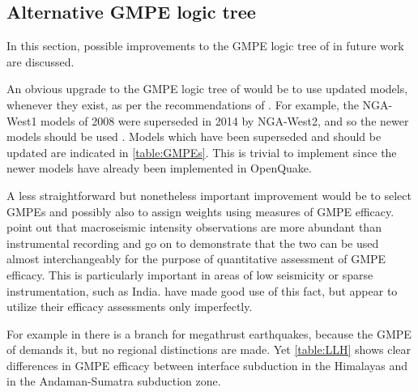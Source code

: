 \documentclass{article}
\begin{document}
\begin{appendices}

\section{Alternative GMPE logic tree}
\label{app:AlternativeGmpes}

In this section, possible improvements to the GMPE logic tree of \cite{nath2012probabilistic} in future work are discussed.

An obvious upgrade to the GMPE logic tree of \cite{nath2012probabilistic} would be to use updated models, whenever they exist, as per the recommendations of \cite{cotton2006criteria}. 
For example, the NGA-West1 models of 2008 were superseded in 2014 by NGA-West2, and so the newer models should be used \cite{bozorgnia2014nga}. 
Models which have been superseded and should be updated are indicated in \autoref{table:GMPEs}. 
This is trivial to implement since the newer models have already been implemented in OpenQuake.

A less straightforward but nonetheless important improvement would be to select GMPEs and possibly also to assign weights using measures of GMPE efficacy.
\cite{delavaud2009information} point out that macroseismic intensity observations are more abundant than instrumental recording and go on to demonstrate that the two can be used almost interchangeably for the purpose of quantitative assessment of GMPE efficacy.
This is particularly important in areas of low seismicity or sparse instrumentation, such as India.
\cite{nath2011peak} have made good use of this fact, but \cite{nath2012probabilistic} appear to utilize their efficacy assessments only imperfectly. 

For example in \citet[Figure~3]{nath2012probabilistic} there is a branch for megathrust earthquakes, because the GMPE of \cite{atkinson2009predicted} demands it, but no regional distinctions are made. 
Yet \autoref{table:LLH} shows clear differences in GMPE efficacy between interface subduction in the Himalayas and in the Andaman-Sumatra subduction zone.


\end{appendices}
\end{document}
